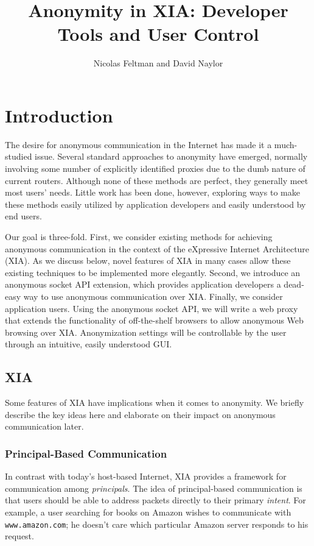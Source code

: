 \documentclass[11pt]{article}
\title{Anonymity in XIA: Developer Tools and User Control}
\author{Nicolas Feltman and David Naylor}
\date{}
\begin{document}
\maketitle
\section{Introduction}
The desire for anonymous communication in the Internet has made it a much-studied issue. Several standard approaches to anonymity have emerged, normally involving some number of explicitly identified proxies  due to the dumb nature of current routers. Although none of these methods are perfect, they generally meet most users' needs. Little work has been done, however, exploring ways to make these methods easily utilized by application developers and easily understood by end users.

Our goal is three-fold. First, we consider existing methods for achieving anonymous communication in the context of the eXpressive Internet Architecture (XIA). As we discuss below, novel features of XIA in many cases allow these existing techniques to be implemented more elegantly. Second, we introduce an anonymous socket API extension, which provides application developers a dead-easy way to use anonymous communication over XIA. Finally, we consider application users. Using the anonymous socket API, we will write a web proxy that extends the functionality of off-the-shelf browsers to allow anonymous Web browsing over XIA. Anonymization settings will be controllable by the user through an intuitive, easily understood GUI.

\subsection{XIA}
Some features of XIA have implications when it comes to anonymity. We briefly describe the key ideas here and elaborate on their impact on anonymous communication later.
\subsubsection{Principal-Based Communication}
In contrast with today's host-based Internet, XIA provides a framework for communication among \emph{principals}. The idea of principal-based communication is that users should be able to address packets directly to their primary \emph{intent}. For example, a user searching for books on Amazon wishes to communicate with \texttt{www.amazon.com}; he doesn't care which particular Amazon server responds to his request.
\end{document}
